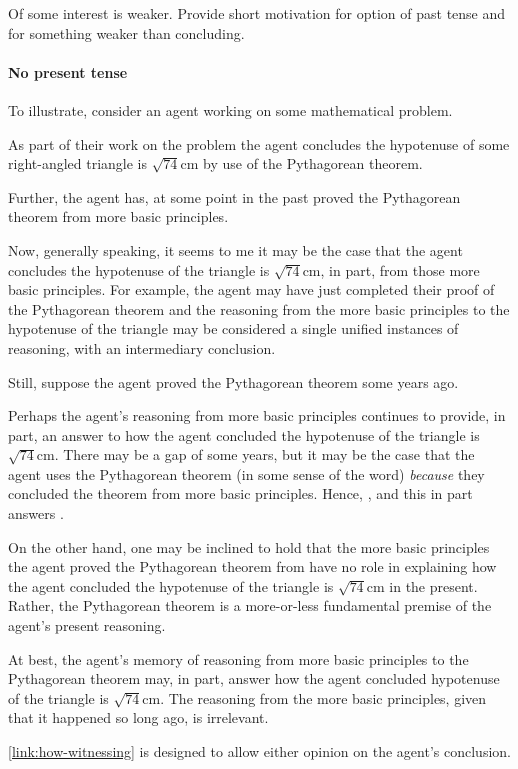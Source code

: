 \begin{note}
  Of some interest is weaker.
  Provide short motivation for option of past tense and for something weaker than concluding.
\end{note}

\paragraph{No present tense}

\begin{note}[Illustration]
  To illustrate, consider an agent working on some mathematical problem.

  As part of their work on the problem the agent concludes the hypotenuse of some right-angled triangle is \(\sqrt{74}\text{cm}\) by use of the Pythagorean theorem.

  Further, the agent has, at some point in the past proved the Pythagorean theorem from more basic principles.

  Now, generally speaking, it seems to me it may be the case that the agent concludes the hypotenuse of the triangle is \(\sqrt{74}\text{cm}\), in part, from those more basic principles.
  For example, the agent may have just completed their proof of the Pythagorean theorem and the reasoning from the more basic principles to the hypotenuse of the triangle may be considered a single unified instances of reasoning, with an intermediary conclusion.

  Still, suppose the agent proved the Pythagorean theorem some years ago.

  Perhaps the agent's reasoning from more basic principles continues to provide, in part, an answer to how the agent concluded the hypotenuse of the triangle is \(\sqrt{74}\text{cm}\).
  There may be a gap of some years, but it may be the case that the agent uses the Pythagorean theorem (in some sense of the word) \emph{because} they concluded the theorem from more basic principles.
  {
    \color{red}
    Hence, \support{}, and this in part answers \qWhyV{}.
  }

  On the other hand, one may be inclined to hold that the more basic principles the agent proved the Pythagorean theorem from have no role in explaining how the agent concluded the hypotenuse of the triangle is \(\sqrt{74}\text{cm}\) in the present.
  Rather, the Pythagorean theorem is a more-or-less fundamental premise of the agent's present reasoning.

  At best, the agent's memory of reasoning from more basic principles to the Pythagorean theorem may, in part, answer how the agent concluded hypotenuse of the triangle is \(\sqrt{74}\text{cm}\).
  The reasoning from the more basic principles, given that it happened so long ago, is irrelevant.

  \autoref{link:how-witnessing} is designed to allow either opinion on the agent's conclusion.
\end{note}

